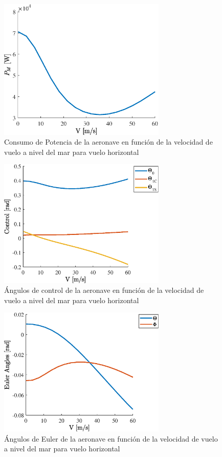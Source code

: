 \begin{figure}
	\centering
	\includegraphics[width=80mm]{graficos/PMVH}
	\caption{Consumo de Potencia de la aeronave en función de la velocidad de vuelo a nivel del mar para vuelo horizontal}
	\label{PMVH}
\end{figure}
\begin{figure}
	\centering
	\includegraphics[width=80mm]{graficos/ControlVH}
	\caption{Ángulos de control de la aeronave en función de la velocidad de vuelo a nivel del mar para vuelo horizontal}
	\label{ControlVH}
\end{figure}
\begin{figure}
	\centering
	\includegraphics[width=80mm]{graficos/EulerVH}
	\caption{Ángulos de Euler de la aeronave en función de la velocidad de vuelo a nivel del mar para vuelo horizontal}
	\label{EulerVH}
\end{figure}
